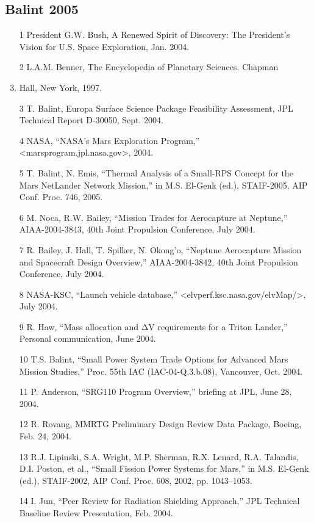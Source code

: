 \documentclass[12pt]{article}
\begin{document}
\subsection*{Balint 2005}
\begin{enumerate}
\item [1] President G.W. Bush, A Renewed Spirit of Discovery: The President’s Vision for U.S. Space Exploration, Jan. 2004.
\item [2] L.A.M. Benner, The Encyclopedia of Planetary Sciences. Chapman
\item Hall, New York, 1997.
\item [3] T. Balint, Europa Surface Science Package Feasibility Assessment, JPL Technical Report D-30050, Sept. 2004.
\item [4] NASA, ``NASA’s Mars Exploration Program,'' <marsprogram.jpl.nasa.gov>, 2004.
\item [5] T. Balint, N. Emis, ``Thermal Analysis of a Small-RPS Concept for the Mars NetLander Network Mission,'' in M.S. El-Genk (ed.), STAIF-2005, AIP Conf. Proc. 746, 2005.
\item [6] M. Noca, R.W. Bailey, ``Mission Trades for Aerocapture at Neptune,'' AIAA-2004-3843, 40th Joint Propulsion Conference, July 2004.
\item [7] R. Bailey, J. Hall, T. Spilker, N. Okong’o, ``Neptune Aerocapture Mission and Spacecraft Design Overview,'' AIAA-2004-3842, 40th Joint Propulsion Conference, July 2004.
\item [8] NASA-KSC, ``Launch vehicle database,'' <elvperf.ksc.nasa.gov/elvMap/>, July 2004.
\item [9] R. Haw, ``Mass allocation and ΔV requirements for a Triton Lander,'' Personal communication, June 2004.
\item [10] T.S. Balint, ``Small Power System Trade Options for Advanced Mars Mission Studies,'' Proc. 55th IAC (IAC-04-Q.3.b.08), Vancouver, Oct. 2004.
\item [11] P. Anderson, ``SRG110 Program Overview,'' briefing at JPL, June 28, 2004.
\item [12] R. Rovang, MMRTG Preliminary Design Review Data Package, Boeing, Feb. 24, 2004.
\item [13] R.J. Lipinski, S.A. Wright, M.P. Sherman, R.X. Lenard, R.A. Talandis, D.I. Poston, et al., ``Small Fission Power Systems for Mars,'' in M.S. El-Genk (ed.), STAIF-2002, AIP Conf. Proc. 608, 2002, pp. 1043--1053.
\item [14] I. Jun, ``Peer Review for Radiation Shielding Approach,'' JPL Technical Baseline Review Presentation, Feb. 2004.
\end{enumerate}
\end{document}
